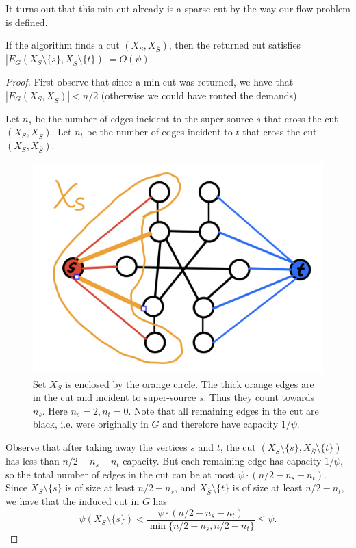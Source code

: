 It turns out that this min-cut already is a sparse cut by the way our flow problem is defined.

\begin{lemma}
If the algorithm finds a cut $(X_S, X_{\overline{S}})$, then the returned cut satisfies $|E_G(X_S \setminus \{s\}, X_{\overline{S}} \setminus \{t\})| = O(\psi)$.
\end{lemma}
\begin{proof}
First observe that since a min-cut was returned, we have that $|E_G(X_S, X_{\overline{S}})| < n/2$ (otherwise we could have routed the demands).

Let $n_s$ be the number of edges incident to the super-source $s$ that cross the cut $(X_S, X_{\overline{S}})$. Let $n_t$ be the number of edges incident to $t$ that cross the cut $(X_S, X_{\overline{S}})$.

\begin{figure}[!ht]
    \centering
    \includegraphics[scale=0.2]{./fig/FewEdgesCrossCut_lectureCutMatching.jpeg}
    \caption{Set $X_S$ is enclosed by the orange circle. The thick orange edges are in the cut and incident to super-source $s$. Thus they count towards $n_s$. Here $n_s = 2, n_t = 0$. Note that all remaining edges in the cut are black, i.e. were originally in $G$ and therefore have capacity $1/\psi$.}
    \label{fig:my_label}
\end{figure}

Observe that after taking away the vertices $s$ and $t$, the cut $(X_S \setminus \{s\}, X_{\overline{S}} \setminus \{t\})$ has less than $n/2 - n_s - n_t$ capacity. But each remaining edge has capacity $1/\psi$, so the total number of edges in the cut can be at most $\psi \cdot (n/2 - n_s - n_t)$. Since $X_S \setminus \{s\}$ is of size at least $n/2-n_s$, and $X_{\overline{S}} \setminus \{t\}$ is of size at least $n/2-n_t$, we have that the induced cut in $G$ has
\[
    \psi(X_S \setminus \{s\}) < \frac{\psi \cdot (n/2 - n_s - n_t)}{\min\{ n/2 - n_s, n/2 - n_t\}} \leq \psi.
\]
\end{proof}

